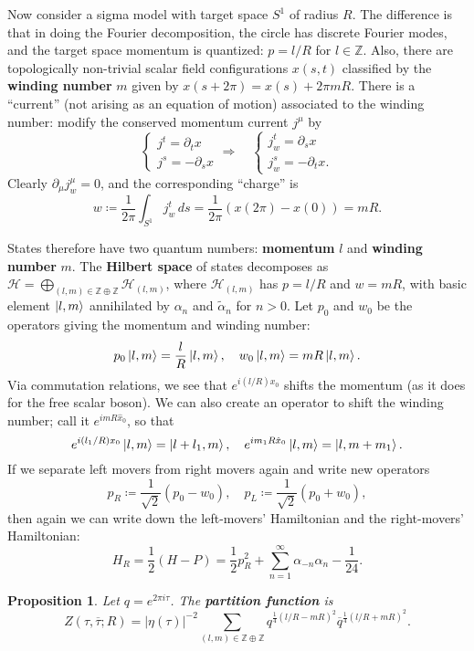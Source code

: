 \documentclass{report}
\theoremstyle{plain}
\newtheorem{proposition}[theorem]{Proposition}
\theoremstyle{definition}
\theoremstyle{remark}
\newcommand{\di}{\partial}
\newcommand{\bZ}{\mathbb{Z}}
\newcommand{\cH}{\mathcal{H}}
\newcommand{\cnj}{\overline}
\begin{document}
Now consider a sigma model with target space $S^1$ of radius $R$. The
difference is that in doing the Fourier decomposition, the circle has
discrete Fourier modes, and the target space momentum is quantized: $p
= l/R$ for $l \in \bZ$. Also, there are topologically non-trivial
scalar field configurations $x(s, t)$ classified by the {\bf winding
  number} $m$ given by $x(s+2\pi) = x(s) + 2\pi mR$. There is a
``current'' (not arising as an equation of motion) associated to the
winding number: modify the conserved momentum current $j^\mu$ by
\[ \begin{cases} j^t = \di_t x \\ j^s = -\di_s x \end{cases} \Rightarrow \quad \begin{cases} j^t_w = \di_s x \\ j^s_w = -\di_t x. \end{cases} \]
Clearly $\di_\mu j^\mu_w = 0$, and the corresponding ``charge'' is
\[ w \coloneqq \frac{1}{2\pi} \int_{S^1} j^t_w \, ds = \frac{1}{2\pi} (x(2\pi) - x(0)) = mR. \]

States therefore have two quantum numbers: {\bf momentum} $l$ and {\bf
  winding number} $m$. The {\bf Hilbert space} of states decomposes as
$\cH = \bigoplus_{(l,m) \in \bZ\oplus \bZ} \cH_{(l,m)}$, where
$\cH_{(l,m)}$ has $p = l/R$ and $w = mR$, with basic element
$\ket{l,m}$ annihilated by $\alpha_n$ and $\tilde\alpha_n$ for $n >
0$. Let $p_0$ and $w_0$ be the operators giving the momentum and
winding number:
\[ p_0 \ket{l,m} = \frac{l}{R} \ket{l,m}, \quad w_0 \ket{l,m} = mR \ket{l,m}. \]
Via commutation relations, we see that $e^{i(l/R)x_0}$ shifts the
momentum (as it does for the free scalar boson). We can also create an
operator to shift the winding number; call it $e^{imR\hat{x}_0}$, so
that
\[ e^{i(l_1/R)x_0} \ket{l, m} = \ket{l + l_1, m}, \quad e^{im_1 R\hat{x}_0} \ket{l, m} = \ket{l, m + m_1}. \]
If we separate left movers from right movers again and write new
operators
\[ p_R \coloneqq \frac{1}{\sqrt{2}}(p_0 - w_0), \quad p_L \coloneqq \frac{1}{\sqrt{2}}(p_0 + w_0), \]
then again we can write down the left-movers' Hamiltonian and the
right-movers' Hamiltonian:
\[ H_R = \frac{1}{2}(H - P) = \frac{1}{2} p_R^2 + \sum_{n=1}^\infty \alpha_{-n}\alpha_n - \frac{1}{24}. \]

\begin{proposition}
  Let $q = e^{2\pi i\tau}$. The {\bf partition function} is
  \[ Z(\tau, \cnj\tau; R) = |\eta(\tau)|^{-2} \sum_{(l,m) \in \bZ\oplus\bZ} q^{\frac{1}{4}(l/R - mR)^2} \cnj q^{\frac{1}{4}(l/R+mR)^2}. \]
\end{proposition}
\end{document}
